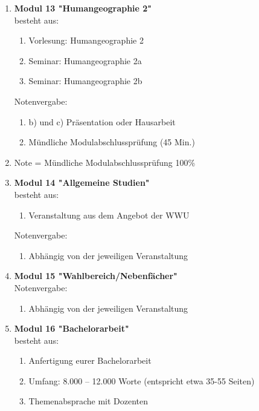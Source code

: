 \begin{enumerate}
 \item \textbf{Modul 13 "Humangeographie 2"}  \\ besteht aus:
  \begin{enumerate}
   \item Vorlesung: Humangeographie 2
   \item Seminar: Humangeographie 2a
   \item Seminar: Humangeographie 2b
  \end{enumerate}\newpage
  Notenvergabe:
  \begin{enumerate}
   \item b) und c) Präsentation oder Hausarbeit
   \item Mündliche Modulabschlussprüfung (45 Min.)
  \end{enumerate}
  \item[] Note = Mündliche Modulabschlussprüfung 100\%

 \item \textbf{Modul 14 "Allgemeine Studien"}  \\ besteht aus:
  \begin{enumerate}
   \item Veranstaltung aus dem Angebot der WWU
  \end{enumerate}
  Notenvergabe:
  \begin{enumerate}
   \item Abhängig von der jeweiligen Veranstaltung
  \end{enumerate}

 \item \textbf{Modul 15 "Wahlbereich/Nebenfächer"}  \\
  Notenvergabe:
   \begin{enumerate}
    \item Abhängig von der jeweiligen Veranstaltung
   \end{enumerate}
 
 \item \textbf{Modul 16 "Bachelorarbeit"}  \\ besteht aus:
  \begin{enumerate}
   \item Anfertigung eurer Bachelorarbeit 
   \item Umfang: 8.000 – 12.000 Worte (entspricht etwa 35-55 Seiten)
   \item Themenabsprache mit Dozenten
  \end{enumerate}




\end{enumerate}

